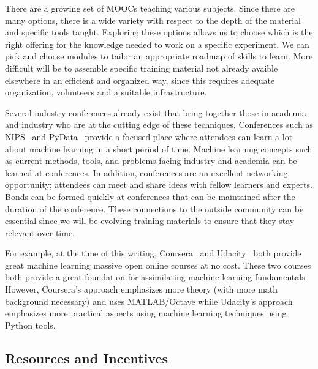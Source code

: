 \documentclass[12pt,a4paper]{article}
\begin{document}
There are a growing set of MOOCs teaching various subjects. Since there are many
options, there is a wide variety with respect to the depth of the material and
specific tools taught. Exploring these options allows us to choose which is the
right offering for the knowledge needed to work on a specific experiment. We
can pick and choose modules to tailor an appropriate roadmap of skills to learn.
More difficult will be to assemble specific training material not already
avaible elsewhere in an efficient and organized way, since this requires
adequate organization, volunteers and a suitable infrastructure.

Several industry conferences already exist that bring together those in academia
and industry who are at the cutting edge of these techniques. Conferences such
as NIPS~\cite{NIPS} and
PyData~\cite{PyData} provide a focused place where
attendees can learn a lot about machine learning in a short period of time.
Machine learning concepts such as current methods, tools, and problems facing
industry and academia can be learned at conferences. In addition, conferences
are an excellent networking opportunity; attendees can meet and share ideas with
fellow learners and experts. Bonds can be formed quickly at conferences that can
be maintained after the duration of the conference. These connections to the
outside community can be essential since we will be evolving training materials
to ensure that they stay relevant over time.

For example, at the time of this writing,
Coursera~\cite{Coursera} and
Udacity~\cite{Udacity}
both provide great machine learning massive open online courses at no cost.
These two courses both provide a great foundation for assimilating machine learning
fundamentals. However, Coursera's approach emphasizes more theory (with more
math background necessary) and uses MATLAB/Octave while Udacity's approach
emphasizes more practical aspects using machine learning techniques 
using Python tools.

\subsection{Resources and Incentives}
\end{document}
